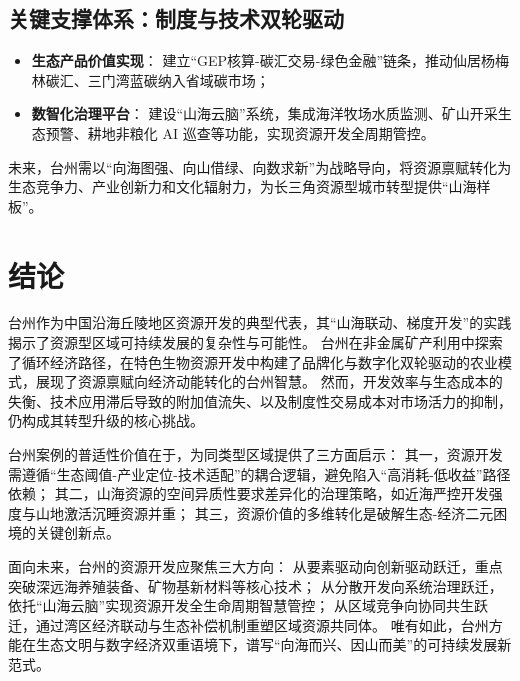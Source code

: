 \documentclass[11pt]{article}
\begin{document}
\subsection{关键支撑体系：制度与技术双轮驱动}\label{subsec:key-support}
\begin{itemize}
  \item \textbf{生态产品价值实现}：
    建立“GEP核算-碳汇交易-绿色金融”链条，推动仙居杨梅林碳汇、三门湾蓝碳纳入省域碳市场；
  \item \textbf{数智化治理平台}：
    建设“山海云脑”系统，集成海洋牧场水质监测、矿山开采生态预警、耕地非粮化 AI 巡查等功能，实现资源开发全周期管控。
\end{itemize}

未来，台州需以“向海图强、向山借绿、向数求新”为战略导向，将资源禀赋转化为生态竞争力、产业创新力和文化辐射力，为长三角资源型城市转型提供“山海样板”。

\section{结论}\label{sec:conclusion}

台州作为中国沿海丘陵地区资源开发的典型代表，其“山海联动、梯度开发”的实践揭示了资源型区域可持续发展的复杂性与可能性。
台州在非金属矿产利用中探索了循环经济路径，在特色生物资源开发中构建了品牌化与数字化双轮驱动的农业模式，展现了资源禀赋向经济动能转化的台州智慧。
然而，开发效率与生态成本的失衡、技术应用滞后导致的附加值流失、以及制度性交易成本对市场活力的抑制，仍构成其转型升级的核心挑战。

台州案例的普适性价值在于，为同类型区域提供了三方面启示：
其一，资源开发需遵循“生态阈值-产业定位-技术适配”的耦合逻辑，避免陷入“高消耗-低收益”路径依赖；
其二，山海资源的空间异质性要求差异化的治理策略，如近海严控开发强度与山地激活沉睡资源并重；
其三，资源价值的多维转化是破解生态-经济二元困境的关键创新点。

面向未来，台州的资源开发应聚焦三大方向：
从要素驱动向创新驱动跃迁，重点突破深远海养殖装备、矿物基新材料等核心技术；
从分散开发向系统治理跃迁，依托“山海云脑”实现资源开发全生命周期智慧管控；
从区域竞争向协同共生跃迁，通过湾区经济联动与生态补偿机制重塑区域资源共同体。
唯有如此，台州方能在生态文明与数字经济双重语境下，谱写“向海而兴、因山而美”的可持续发展新范式。
\end{document}
